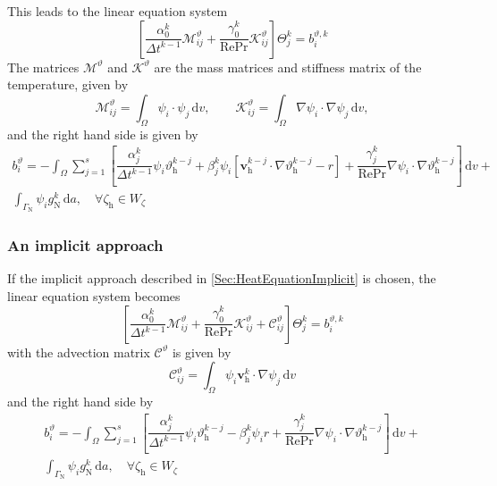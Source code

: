 \documentclass[]{scrartcl}
\renewcommand{\d}{\,\mathrm{d}}
\newcommand{\bs}[1]{\boldsymbol{#1}}
\begin{document}
This leads to the linear equation system
\begin{equation*}
\left[
\dfrac{\alpha_0^k}{\Delta t^{k-1}} 
\mathcal{M}^\vartheta_{ij}
+
\dfrac{\gamma_0^k}{\textrm{Re}\textrm{Pr}}
\mathcal{K}^\vartheta_{ij}
\right]
\varTheta^k_j
= 
b^{\vartheta, k}_i
\end{equation*}
The matrices $\mathcal{M}^\vartheta$ and $\mathcal{K}^\vartheta$ are the mass matrices and stiffness matrix of the temperature, given by
\begin{equation*}
\mathcal{M}^\vartheta_{ij}= \int_{\Omega} \psi_i \cdot \psi_j \d v,
\qquad
\mathcal{K}^\vartheta_{ij} = \int_{\Omega} \nabla \psi_i \cdot \nabla \psi_j \d v,
\end{equation*}
and the right hand side is given by 
\begin{equation*}
\begin{split}
b^\vartheta_i = -
\int_{\Omega}
\sum_{j=1}^{s} 
\left[
\dfrac{\alpha_j^k}{\Delta t^{k-1}}\psi_i \vartheta^{k-j}_\textrm{h}
+
\beta_j^k \psi_i \left[ \bs{v}^{k-j}_\textrm{h} \cdot \nabla \vartheta^{k-j}_\textrm{h} - r \right]
+ 
\dfrac{\gamma_j^k}{\textrm{Re}\textrm{Pr}} \nabla \psi_i \cdot \nabla \vartheta^{k-j}_\textrm{h}
\right]
\d v 
+ \\
\int_{\Gamma_\textrm{N}}
 \psi_i g_\textrm{N}^k
\d a, \quad \forall \zeta_\textrm{h} \in W_\zeta
\end{split}
\end{equation*}
\subsubsection{An implicit approach}
If the implicit approach described in \cref{Sec:HeatEquationImplicit} is chosen, the linear equation system becomes
\begin{equation*}
\left[
\dfrac{\alpha_0^k}{\Delta t^{k-1}} 
\mathcal{M}^\vartheta_{ij}
+
\dfrac{\gamma_0^k}{\textrm{Re}\textrm{Pr}}
\mathcal{K}^\vartheta_{ij}
+
\mathcal{C}^\vartheta_{ij}
\right]
\varTheta^k_j
= 
b^{\vartheta, k}_i
\end{equation*}
with the advection matrix $\mathcal{C}^\vartheta$ is given by
\begin{equation*}
	\mathcal{C}^\vartheta_{ij} = \int_{\Omega} \psi_i \bs{v}^{k}_\textrm{h} \cdot \nabla \psi_j \d v
\end{equation*}
and the right hand side by
\begin{equation*}
\begin{split}
b^\vartheta_i = -
\int_{\Omega}
\sum_{j=1}^{s} 
\left[
\dfrac{\alpha_j^k}{\Delta t^{k-1}}\psi_i \vartheta^{k-j}_\textrm{h}
-
\beta_j^k \psi_i r
+ 
\dfrac{\gamma_j^k}{\textrm{Re}\textrm{Pr}} \nabla \psi_i \cdot \nabla \vartheta^{k-j}_\textrm{h}
\right]
\d v 
+ \\
\int_{\Gamma_\textrm{N}} \psi_i g_\textrm{N}^k
\d a, \quad \forall \zeta_\textrm{h} \in W_\zeta
\end{split}
\end{equation*}
\end{document}

